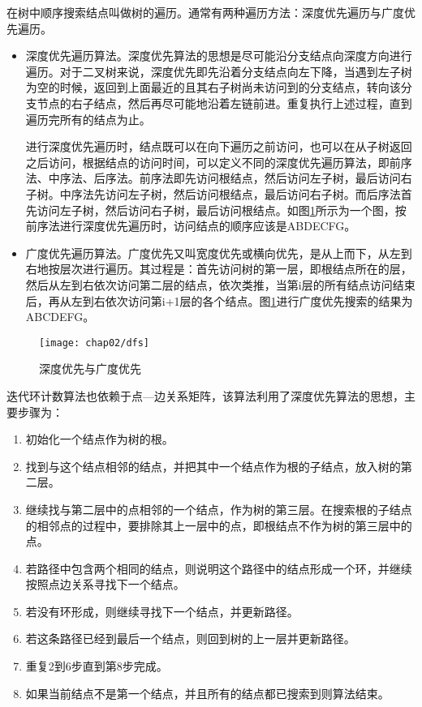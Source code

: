 在树中顺序搜索结点叫做树的遍历。通常有两种遍历方法：深度优先遍历与广度优先遍历。
\begin{itemize}

\item 深度优先遍历算法。深度优先算法的思想是尽可能沿分支结点向深度方向进行遍历。对于二叉树来说，深度优先即先沿着分支结点向左下降，当遇到左子树为空的时候，返回到上面最近的且其右子树尚未访问到的分支结点，转向该分支节点的右子结点，然后再尽可能地沿着左链前进。重复执行上述过程，直到遍历完所有的结点为止。

进行深度优先遍历时，结点既可以在向下遍历之前访问，也可以在从子树返回之后访问，根据结点的访问时间，可以定义不同的深度优先遍历算法，即前序法、中序法、后序法。前序法即先访问根结点，然后访问左子树，最后访问右子树。中序法先访问左子树，然后访问根结点，最后访问右子树。而后序法首先访问左子树，然后访问右子树，最后访问根结点。如图\ref{fig:dfs}所示为一个图，按前序法进行深度优先遍历时，访问结点的顺序应该是ABDECFG。

\item 广度优先遍历算法。广度优先又叫宽度优先或横向优先，是从上而下，从左到右地按层次进行遍历。其过程是：首先访问树的第一层，即根结点所在的层，然后从左到右依次访问第二层的结点，依次类推，当第i层的所有结点访问结束后，再从左到右依次访问第i+1层的各个结点。图\ref{fig:dfs}进行广度优先搜索的结果为ABCDEFG。

\end{itemize}

\begin{figure}[H]
\centering
\texttt{[image: chap02/dfs]}
\caption{深度优先与广度优先}
\label{fig:dfs}
\end{figure}

迭代环计数算法也依赖于点---边关系矩阵，该算法利用了深度优先算法的思想，主要步骤为：
\begin{enumerate}
\item 初始化一个结点作为树的根。
\item 找到与这个结点相邻的结点，并把其中一个结点作为根的子结点，放入树的第二层。
\item 继续找与第二层中的点相邻的一个结点，作为树的第三层。在搜索根的子结点的相邻点的过程中，要排除其上一层中的点，即根结点不作为树的第三层中的点。
\item 若路径中包含两个相同的结点，则说明这个路径中的结点形成一个环，并继续按照点边关系寻找下一个结点。
\item 若没有环形成，则继续寻找下一个结点，并更新路径。
\item 若这条路径已经到最后一个结点，则回到树的上一层并更新路径。
\item 重复2到6步直到第8步完成。
\item 如果当前结点不是第一个结点，并且所有的结点都已搜索到则算法结束。
\end{enumerate}

